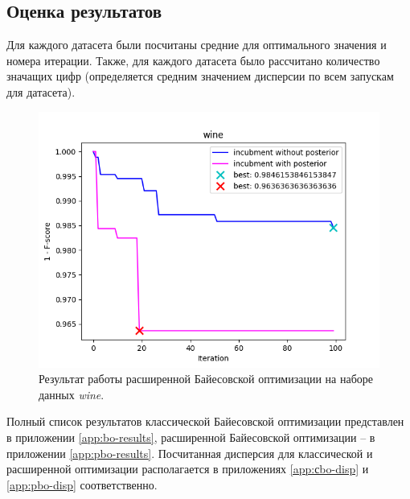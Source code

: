 \documentclass[times,specification,annotation]{itmo-student-thesis}
\begin{document}
	\subsection{Оценка результатов}
	Для каждого датасета были посчитаны средние для оптимального значения и номера итерации. Также, для каждого датасета было рассчитано количество значащих цифр (определяется средним значением дисперсии по всем запускам для датасета). \par
	\begin{figure}[!ht]
		\caption{Результат работы расширенной Байесовской оптимизации на наборе данных \textit{wine}.}\label{img:pbo-wine}
		\includegraphics[width=0.85\linewidth]{../png/incubment-iteration-posterior/wine}
		\centering
	\end{figure}
	Полный список результатов классической Байесовской оптимизации представлен в приложении  \ref{app:bo-results}, расширенной Байесовской оптимизации -- в приложении \ref{app:pbo-results}. Посчитанная дисперсия для классической и расширенной оптимизации располагается в приложениях \ref{app:сbo-disp} и \ref{app:pbo-disp} соответственно.
	
\end{document}
